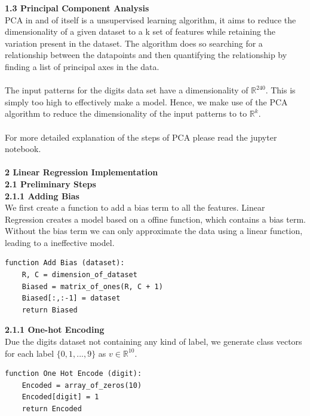 \documentclass[a4paper]{article}
\begin{document}
\textbf{{\large 1.3 Principal Component Analysis}} \\

PCA in and of itself is a unsupervised learning algorithm, it aims to reduce the dimensionality of a given dataset to a k set of features while retaining the variation present in the dataset. The algorithm does so searching for a relationship between the datapoints and then quantifying the relationship by finding a list of principal axes in the data. \\ \\
The input patterns for the digits data set have a dimensionality of $\mathbb{R}^{240}$. This is simply too high to effectively make a model. Hence, we make use of the PCA algorithm to reduce the dimensionality of the input patterns to to $\mathbb{R}^{k}$. \\ \\
For more detailed explanation of the steps of PCA please read the jupyter notebook. \\
\\

\textbf{{\Large 2 Linear Regression Implementation}} \\ 

\textbf{{\large 2.1 Preliminary Steps}} \\ 

\textbf{2.1.1 Adding Bias} \\

We first create a function to add a bias term to all the features. Linear Regression creates a model based on a offine function, which contains a bias term. Without the bias term we can only approximate the data using a linear function, leading to a ineffective model. \\

\begin{lstlisting}
function Add Bias (dataset):
    R, C = dimension_of_dataset
    Biased = matrix_of_ones(R, C + 1)
    Biased[:,:-1] = dataset
    return Biased
\end{lstlisting}


\textbf{2.1.1 One-hot Encoding} \\

Due the digits dataset not containing any kind of label, we generate class vectors for each label $\{0,1,...,9\}$ as $v \in \mathbb{R}^{10}$. \\

\begin{lstlisting}
function One Hot Encode (digit):
    Encoded = array_of_zeros(10)
    Encoded[digit] = 1
    return Encoded 
\end{lstlisting}
\qquad \\
\end{document}
